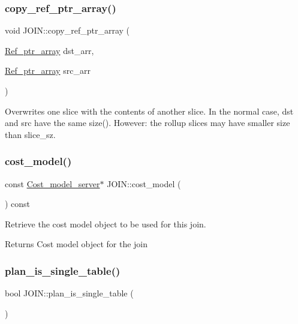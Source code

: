 \subsubsection{\texorpdfstring{copy\+\_\+ref\+\_\+ptr\+\_\+array()}{copy\_ref\_ptr\_array()}}
{\footnotesize\ttfamily void J\+O\+I\+N\+::copy\+\_\+ref\+\_\+ptr\+\_\+array (\begin{DoxyParamCaption}\item[{\mbox{\hyperlink{classBounds__checked__array}{Ref\+\_\+ptr\+\_\+array}}}]{dst\+\_\+arr,  }\item[{\mbox{\hyperlink{classBounds__checked__array}{Ref\+\_\+ptr\+\_\+array}}}]{src\+\_\+arr }\end{DoxyParamCaption})\hspace{0.3cm}{\ttfamily [inline]}}

Overwrites one slice with the contents of another slice. In the normal case, dst and src have the same size(). However\+: the rollup slices may have smaller size than slice\+\_\+sz. \mbox{\label{classJOIN_ae401f39f0804185f108edebcb639c7dc}} 
\subsubsection{\texorpdfstring{cost\+\_\+model()}{cost\_model()}}
{\footnotesize\ttfamily const \mbox{\hyperlink{classCost__model__server}{Cost\+\_\+model\+\_\+server}}$\ast$ J\+O\+I\+N\+::cost\+\_\+model (\begin{DoxyParamCaption}{ }\end{DoxyParamCaption}) const\hspace{0.3cm}{\ttfamily [inline]}}

Retrieve the cost model object to be used for this join.

\begin{DoxyReturn}{Returns}
Cost model object for the join 
\end{DoxyReturn}
\mbox{\label{classJOIN_a0c4c676ce74a6a273c6fc5492406e462}} 
\subsubsection{\texorpdfstring{plan\+\_\+is\+\_\+single\+\_\+table()}{plan\_is\_single\_table()}}
{\footnotesize\ttfamily bool J\+O\+I\+N\+::plan\+\_\+is\+\_\+single\+\_\+table (\begin{DoxyParamCaption}{ }\end{DoxyParamCaption})\hspace{0.3cm}{\ttfamily [inline]}}

